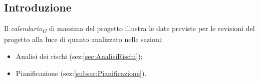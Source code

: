 \subsection{Introduzione}
Il \textit{calendario}\textsubscript{\textit{G}} di massima del progetto illustra le date previste per le revisioni del progetto
alla luce di quanto analizzato nelle sezioni: 
\begin{itemize}
    \item Analisi dei rischi (sez:\ref{sec:AnalisiRischi});
    \item Pianificazione (sez:\ref{subsec:Pianificazione}).
\end{itemize}